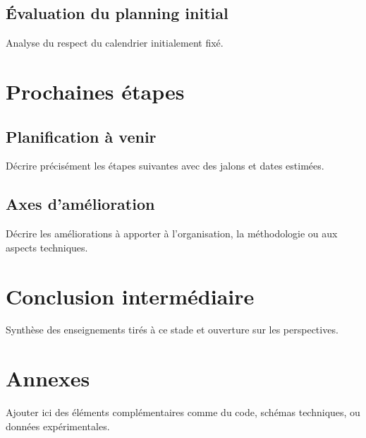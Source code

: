 \documentclass[a4paper,12pt]{report}
\begin{document}
\section{Évaluation du planning initial}
Analyse du respect du calendrier initialement fixé.

\chapter{Prochaines étapes}

\section{Planification à venir}
Décrire précisément les étapes suivantes avec des jalons et dates estimées.

\section{Axes d'amélioration}
Décrire les améliorations à apporter à l'organisation, la méthodologie ou aux aspects techniques.

\chapter*{Conclusion intermédiaire}
Synthèse des enseignements tirés à ce stade et ouverture sur les perspectives.

\appendix
\chapter{Annexes}
Ajouter ici des éléments complémentaires comme du code, schémas techniques, ou données expérimentales.
\end{document}
